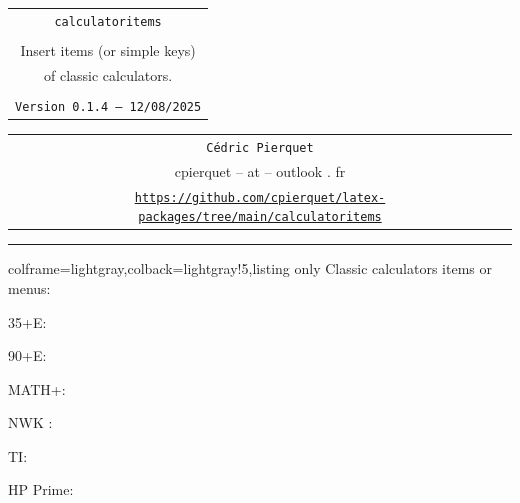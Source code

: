 \documentclass[11pt,a4paper]{ltxdoc}
\def\TPversion{0.1.4}
\def\TPdate{12/08/2025}
\begin{document}
\thispagestyle{empty}

\begin{center}
	\begin{minipage}{0.88\linewidth}
		\begin{tcolorbox}[colframe=yellow,colback=yellow!15]
			\begin{center}
				\renewcommand{\arraystretch}{1.25}%
				\begin{tabular}{c}
					{\Huge \texttt{calculatoritems}}\\
					\\
					{\LARGE Insert items (or simple keys)} \\
					{\LARGE of classic calculators.} \\
					\\
					{\small \texttt{Version \TPversion{} -- \TPdate}}
				\end{tabular}
			\end{center}
		\end{tcolorbox}
	\end{minipage}
\end{center}

\begin{center}
	\begin{tabular}{c}
		\texttt{Cédric Pierquet}\\
		{\ttfamily cpierquet -- at -- outlook . fr}\\
		\texttt{\url{https://github.com/cpierquet/latex-packages/tree/main/calculatoritems}} \\
	\end{tabular}
\end{center}

\hrule

\vfill

\begin{tcblisting}{colframe=lightgray,colback=lightgray!5,listing only}
Classic calculators items or menus:

35+E:

90+E:

MATH+:

NWK :

TI:

HP Prime:
\end{tcblisting}
\end{document}
